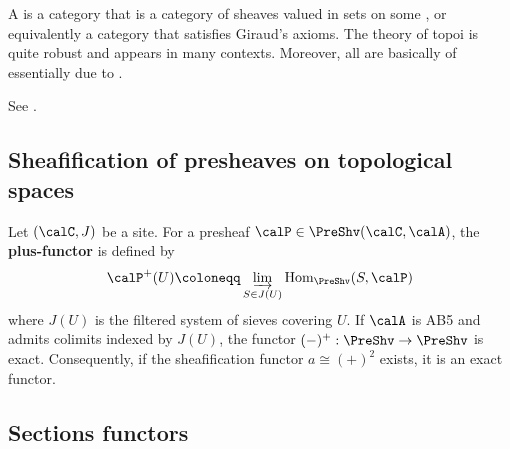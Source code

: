 A  is a category that is  a category of sheaves valued in sets on some , or equivalently a category that satisfies Giraud's axioms. The theory of topoi is quite robust and appears in many contexts. Moreover, all  are basically  of  essentially due to .

See .

\subsection{Sheafification of presheaves on topological spaces}











\begin{definition}
    Let $(\calC, J)$ be a site. For a presheaf $\calP \in \PreShv(\calC, \calA)$, the \textbf{plus-functor} is defined by
    \[ \calP^+(U) \coloneqq \varinjlim_{S \in J(U)} \text{Hom}_{\PreShv}(S, \calP) \]
    where $J(U)$ is the filtered system of sieves covering $U$. If $\calA$ is AB5 and admits colimits indexed by $J(U)$, the functor $(-)^+: \PreShv \to \PreShv$ is exact. Consequently, if the sheafification functor $a \cong (+)^2$ exists, it is an exact functor.
\end{definition}


\subsection{Sections functors}

